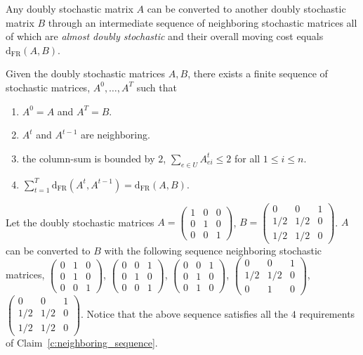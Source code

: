 \documentclass[a4paper,UKenglish,cleveref,autoref, thm-restate]{lipics-v2019}
\def\dfr{\mathrm{d}_{\mathrm{FR}}}
\begin{document}
\noindent Any doubly stochastic matrix $A$ can be converted to another doubly stochastic matrix $B$ through an intermediate sequence of neighboring stochastic matrices all of which are \textit{almost doubly stochastic}
and their overall moving cost equals $\mathrm{d}_{\mathrm{FR}}(A,B)$.
\begin{claim}\label{c:neighboring_sequence}
Given the doubly stochastic matrices $A,B$, there exists a finite sequence of stochastic matrices, $A^0,\ldots,A^T$ such that
\begin{enumerate}
    \item $A^0= A$ and $A^T = B$.
    
    \item $A^t$ and $A^{t-1}$ are neighboring.
    
    \item the column-sum is bounded by $2$, $\sum_{e \in U} A_{ei}^t \leq 2$ for all $1\leq i \leq n$.
    
    \item $\sum_{t=1}^T \dfr(A^t, A^{t-1}) = \dfr(A,B)$.
\end{enumerate}
\end{claim}
\begin{example}
Let the doubly stochastic matrices $A = 
\begin{pmatrix}
1 & 0 & 0 \\
0 & 1 & 0 \\
0 & 0 & 1
\end{pmatrix}$, $B = 
\begin{pmatrix}
0 & 0 & 1 \\
1/2 & 1/2 & 0 \\
1/2 & 1/2 & 0
\end{pmatrix}$. $A$ can be converted to $B$ with the following sequence neighboring stochastic matrices, 
\smallskip
$\begin{pmatrix}
0 & 1 & 0 \\
0 & 1 & 0 \\
0 & 0 & 1
\end{pmatrix}$,
$\begin{pmatrix}
0 & 0 & 1 \\
0 & 1 & 0 \\
0 & 0 & 1
\end{pmatrix}$,
$\begin{pmatrix}
0 & 0 & 1 \\
0 & 1 & 0 \\
0 & 1 & 0
\end{pmatrix}$,
$\begin{pmatrix}
0 & 0 & 1 \\
1/2 & 1/2 & 0 \\
0 & 1 & 0
\end{pmatrix}$,
$\begin{pmatrix}
0 & 0 & 1 \\
1/2 & 1/2 & 0 \\
1/2 & 1/2 & 0
\end{pmatrix}$.
\smallskip
Notice that the above sequence satisfies all the $4$ requirements of Claim~\ref{c:neighboring_sequence}.
\end{example}
\end{document}
